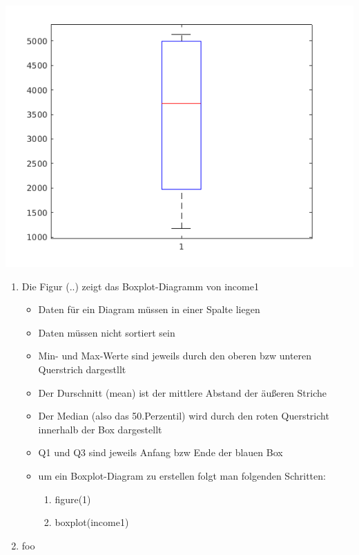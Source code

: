 \includegraphics{Graphik/income1}

\begin{enumerate}
	\item Die Figur (..) zeigt das Boxplot-Diagramm von income1 
	\begin{itemize}
		\item Daten für ein Diagram müssen in einer Spalte liegen
		\item Daten müssen nicht sortiert sein
		\item Min- und Max-Werte sind jeweils durch den oberen bzw unteren Querstrich dargestllt
		\item Der Durschnitt (mean) ist der mittlere Abstand der äußeren  Striche
		\item Der Median (also das 50.Perzentil) wird durch den roten Querstricht innerhalb der Box dargestellt
		\item Q1 und Q3 sind jeweils Anfang bzw Ende der blauen Box
		\item um ein Boxplot-Diagram zu erstellen folgt man folgenden Schritten:
		\begin{enumerate}
			\item figure(1)
			\item boxplot(income1)
		\end{enumerate}
	\end{itemize}
	\item foo 

\end{enumerate}
